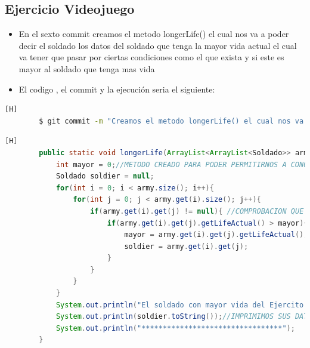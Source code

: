 \documentclass{article}
\begin{document}
	\subsection{Ejercicio Videojuego}
	\begin{itemize}	
		\item En el sexto commit creamos el metodo longerLife() el cual nos va a poder decir el soldado los datos del soldado que tenga la mayor vida actual el cual va tener que pasar por ciertas condiciones como el que exista y si este es mayor al soldado que tenga mas vida
		\item El codigo , el commit y la ejecución seria el siguiente:
	\end{itemize}	
	\begin{lstlisting}[language=bash,caption={Commit}][H]
		$ git commit -m "Creamos el metodo longerLife() el cual nos va a poder decir el soldado los datos del soldado que tenga la mayor vida actual el cual va tener que pasar por ciertas condiciones como el que exista y si este es mayor al soldado que tenga mas vida"
	\end{lstlisting}	
	\begin{lstlisting}[language=java,caption={Las lineas de codigos del metodo creado:}][H]
		public static void longerLife(ArrayList<ArrayList<Soldado>> army, int num){
			int mayor = 0;//METODO CREADO PARA PODER PERMITIRNOS A CONOCER EL SOLDADO CON MAYOR VIDA DE CADA EJERCITO 
			Soldado soldier = null;
			for(int i = 0; i < army.size(); i++){
				for(int j = 0; j < army.get(i).size(); j++){
					if(army.get(i).get(j) != null){ //COMPROBACION QUE HACEMOS PARA PODER DECIR QUE EL CASILLERO DONDE ESTAMOS ES UN SOLDADO QUE EXISTE
						if(army.get(i).get(j).getLifeActual() > mayor){ //COMPARAMOS PUNTOS DE VIDA DE CADA SOLDADO PARA VER QUIEN ES EL MAYOR 
							mayor = army.get(i).get(j).getLifeActual();
							soldier = army.get(i).get(j);
						}
					}
				}
			}
			System.out.println("El soldado con mayor vida del Ejercito " + num + " es: ");
			System.out.println(soldier.toString());//IMPRIMIMOS SUS DATOS PARA PODER VER DE QUE SOLDADO SE TRATA 
			System.out.println("*********************************");
		}

	\end{lstlisting}
\end{document}
